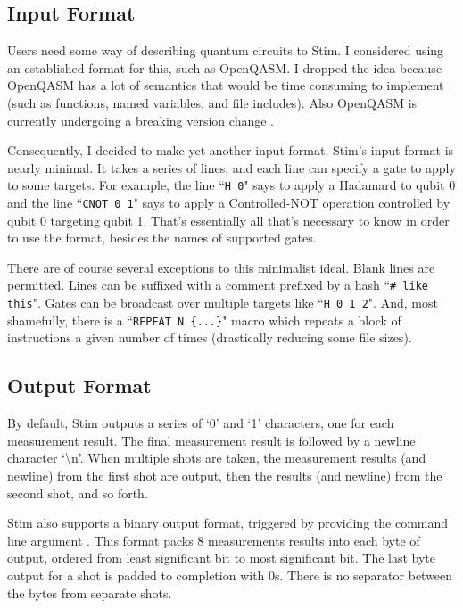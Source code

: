 \documentclass[onecolumn,unpublished]{quantumarticle}
\theoremstyle{definition}
\theoremstyle{definition}
\theoremstyle{definition}
\begin{document}
\subsection{Input Format}

Users need some way of describing quantum circuits to Stim.
I considered using an established format for this, such as OpenQASM.
I dropped the idea because OpenQASM has a lot of semantics that would be time consuming to implement (such as functions, named variables, and file includes).
Also OpenQASM is currently undergoing a breaking version change \cite{openqasmbreakingchange}.

Consequently, I decided to make yet another input format.
Stim's input format is nearly minimal.
It takes a series of lines, and each line can specify a gate to apply to some targets.
For example, the line ``\texttt{H 0}" says to apply a Hadamard to qubit 0 and the line ``\texttt{CNOT 0 1}" says to apply a Controlled-NOT operation controlled by qubit 0 targeting qubit 1.
That's essentially all that's necessary to know in order to use the format, besides the names of supported gates.

There are of course several exceptions to this minimalist ideal.
Blank lines are permitted.
Lines can be suffixed with a comment prefixed by a hash ``\texttt{\# like this}".
Gates can be broadcast over multiple targets like ``\texttt{H 0 1 2}".
And, most shamefully, there is a ``\texttt{REPEAT N \{...\}}" macro which repeats a block of instructions a given number of times (drastically reducing some file sizes).

\subsection{Output Format}

By default, Stim outputs a series of `0' and `1' characters, one for each measurement result.
The final measurement result is followed by a newline character `\textbackslash n'.
When multiple shots are taken, the measurement results (and newline) from the first shot are output, then the results (and newline) from the second shot, and so forth.

Stim also supports a binary output format, triggered by providing the command line argument .
This format packs 8 measurements results into each byte of output, ordered from least significant bit to most significant bit.
The last byte output for a shot is padded to completion with 0s.
There is no separator between the bytes from separate shots.
\end{document}
